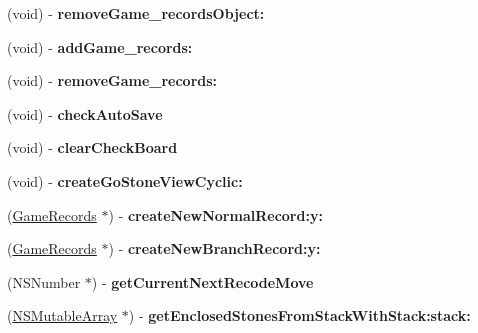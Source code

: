 \begin{DoxyCompactItemize}
\item 
\hypertarget{interface_games_ac747f01b9449eac068cd3f400c75f4da}{
(void) -\/ {\bfseries removeGame\_\-recordsObject:}}
\label{interface_games_ac747f01b9449eac068cd3f400c75f4da}

\item 
\hypertarget{interface_games_a728428abc6477a64e3af4fb03a67fc60}{
(void) -\/ {\bfseries addGame\_\-records:}}
\label{interface_games_a728428abc6477a64e3af4fb03a67fc60}

\item 
\hypertarget{interface_games_a221f3c724f98ffa3f870d6f597750557}{
(void) -\/ {\bfseries removeGame\_\-records:}}
\label{interface_games_a221f3c724f98ffa3f870d6f597750557}

\item 
\hypertarget{interface_games_a4b748d245b2717e54d5581aaa851a9b5}{
(void) -\/ {\bfseries checkAutoSave}}
\label{interface_games_a4b748d245b2717e54d5581aaa851a9b5}

\item 
\hypertarget{interface_games_aede639ff391e10c3b864b2610155bd5e}{
(void) -\/ {\bfseries clearCheckBoard}}
\label{interface_games_aede639ff391e10c3b864b2610155bd5e}

\item 
\hypertarget{interface_games_a9bd21f92c54850bcb5b474602522376a}{
(void) -\/ {\bfseries createGoStoneViewCyclic:}}
\label{interface_games_a9bd21f92c54850bcb5b474602522376a}

\item 
\hypertarget{interface_games_a80bf136743a5da3cc6c3e13bc2c71ecb}{
(\hyperlink{interface_game_records}{GameRecords} $\ast$) -\/ {\bfseries createNewNormalRecord:y:}}
\label{interface_games_a80bf136743a5da3cc6c3e13bc2c71ecb}

\item 
\hypertarget{interface_games_aa04ffa3b4aef586defb52c1b8e4c91ec}{
(\hyperlink{interface_game_records}{GameRecords} $\ast$) -\/ {\bfseries createNewBranchRecord:y:}}
\label{interface_games_aa04ffa3b4aef586defb52c1b8e4c91ec}

\item 
\hypertarget{interface_games_ad2d24effe36485105bde94171e77deb6}{
(NSNumber $\ast$) -\/ {\bfseries getCurrentNextRecodeMove}}
\label{interface_games_ad2d24effe36485105bde94171e77deb6}

\item 
\hypertarget{interface_games_a7eb3fe2c98bf87e30a85aa5312db2d99}{
(\hyperlink{class_n_s_mutable_array}{NSMutableArray} $\ast$) -\/ {\bfseries getEnclosedStonesFromStackWithStack:stack:}}
\label{interface_games_a7eb3fe2c98bf87e30a85aa5312db2d99}


\end{DoxyCompactItemize}
